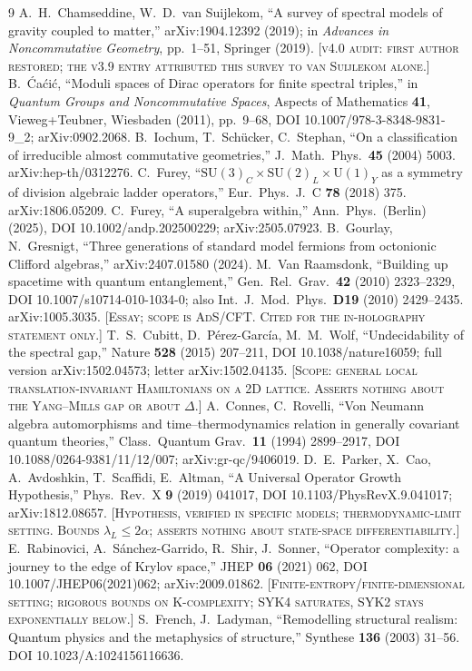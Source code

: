 \documentclass[12pt,a4paper,twoside]{article}
\theoremstyle{plain}
\theoremstyle{definition}
\theoremstyle{remark}
\begin{document}
\begin{thebibliography}{9}
A.~H.~Chamseddine, W.~D.~van Suijlekom, ``A survey of spectral models of gravity coupled to matter,'' arXiv:1904.12392 (2019); in \emph{Advances in Noncommutative Geometry}, pp.~1--51, Springer (2019). \textsc{[v4.0 audit: first author restored; the v3.9 entry attributed this survey to van Suijlekom alone.]}
B.~\'{C}a\'{c}i\'{c}, ``Moduli spaces of Dirac operators for finite spectral triples,'' in \emph{Quantum Groups and Noncommutative Spaces}, Aspects of Mathematics \textbf{41}, Vieweg+Teubner, Wiesbaden (2011), pp.~9--68, DOI 10.1007/978-3-8348-9831-9\_2; arXiv:0902.2068.
B.~Iochum, T.~Sch\"{u}cker, C.~Stephan, ``On a classification of irreducible almost commutative geometries,'' J.\ Math.\ Phys.\ \textbf{45} (2004) 5003. arXiv:hep-th/0312276.
C.~Furey, ``$\mathrm{SU}(3)_C\times\mathrm{SU}(2)_L\times\mathrm{U}(1)_Y$ as a symmetry of division algebraic ladder operators,'' Eur.\ Phys.\ J.\ C \textbf{78} (2018) 375. arXiv:1806.05209.
C.~Furey, ``A superalgebra within,'' Ann.\ Phys.\ (Berlin) (2025), DOI 10.1002/andp.202500229; arXiv:2505.07923.
B.~Gourlay, N.~Gresnigt, ``Three generations of standard model fermions from octonionic Clifford algebras,'' arXiv:2407.01580 (2024).
M.~Van Raamsdonk, ``Building up spacetime with quantum entanglement,'' Gen.\ Rel.\ Grav.\ \textbf{42} (2010) 2323--2329, DOI 10.1007/s10714-010-1034-0; also Int.\ J.\ Mod.\ Phys.\ \textbf{D19} (2010) 2429--2435. arXiv:1005.3035. \textsc{[Essay; scope is AdS/CFT. Cited for the in-holography statement only.]}
T.~S.~Cubitt, D.~P\'erez-Garc\'ia, M.~M.~Wolf, ``Undecidability of the spectral gap,'' Nature \textbf{528} (2015) 207--211, DOI 10.1038/nature16059; full version arXiv:1502.04573; letter arXiv:1502.04135. \textsc{[Scope: general local translation-invariant Hamiltonians on a 2D lattice. Asserts nothing about the Yang--Mills gap or about $\Delta$.]}
A.~Connes, C.~Rovelli, ``Von Neumann algebra automorphisms and time--thermodynamics relation in generally covariant quantum theories,'' Class.\ Quantum Grav.\ \textbf{11} (1994) 2899--2917, DOI 10.1088/0264-9381/11/12/007; arXiv:gr-qc/9406019.
D.~E.~Parker, X.~Cao, A.~Avdoshkin, T.~Scaffidi, E.~Altman, ``A Universal Operator Growth Hypothesis,'' Phys.\ Rev.\ X \textbf{9} (2019) 041017, DOI 10.1103/PhysRevX.9.041017; arXiv:1812.08657. \textsc{[Hypothesis, verified in specific models; thermodynamic-limit setting. Bounds $\lambda_L \le 2\alpha$; asserts nothing about state-space differentiability.]}
E.~Rabinovici, A.~S\'anchez-Garrido, R.~Shir, J.~Sonner, ``Operator complexity: a journey to the edge of Krylov space,'' JHEP \textbf{06} (2021) 062, DOI 10.1007/JHEP06(2021)062; arXiv:2009.01862. \textsc{[Finite-entropy/finite-dimensional setting; rigorous bounds on K-complexity; SYK4 saturates, SYK2 stays exponentially below.]}
S.~French, J.~Ladyman, ``Remodelling structural realism: Quantum physics and
the metaphysics of structure,'' Synthese \textbf{136} (2003) 31--56.
DOI 10.1023/A:1024156116636.


\end{thebibliography}
\end{document}
